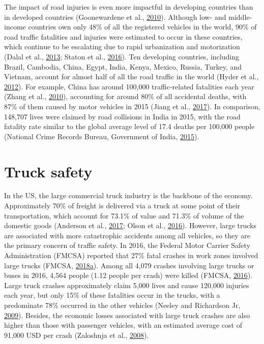 \documentclass[12pt]{book}
\numberwithin{equation}{chapter}
\begin{document}
The impact of road injuries is even more impactful in developing countries than in developed countries (Goonewardene et al., \protect\hyperlink{ref-goonewardene2010road}{2010}).
Although low- and middle-income countries own only 48\% of all the registered vehicles in the world, 90\% of road traffic fatalities and injuries were estimated to occur in these countries, which continue to be escalating due to rapid urbanization and motorization (Dalal et al., \protect\hyperlink{ref-dalal2013economics}{2013}; Staton et al., \protect\hyperlink{ref-staton2016road}{2016}).
Ten developing countries, including Brazil, Cambodia, China, Egypt, India, Kenya, Mexico, Russia, Turkey, and Vietnam, account for almost half of all the road traffic in the world (Hyder et al., \protect\hyperlink{ref-hyder2012addressing}{2012}).
For example, China has around 100,000 traffic-related fatalities each year (Zhang et al., \protect\hyperlink{ref-zhang2010road}{2010}), accounting for around 80\% of all accidental deaths, with 87\% of them caused by motor vehicles in 2015 (Jiang et al., \protect\hyperlink{ref-jiang2017transport}{2017}).
In comparison, 148,707 lives were claimed by road collisions in India in 2015, with the road fatality rate similar to the global average level of 17.4 deaths per 100,000 people (National Crime Records Bureau, Government of India, \protect\hyperlink{ref-india2015}{2015}).

\hypertarget{truck-safety}{%
\section{Truck safety}\label{truck-safety}}

In the US, the large commercial truck industry is the backbone of the economy. Approximately 70\% of freight is delivered via a truck at some point of their transportation, which account for 73.1\% of value and 71.3\% of volume of the domestic goods (Anderson et al., \protect\hyperlink{ref-anderson2017exploratory}{2017}; Olson et al., \protect\hyperlink{ref-olson2016weight}{2016}).
However, large trucks are associated with more catastrophic accidents among all vehicles, so they are the primary concern of traffic safety. In 2016, the Federal Motor Carrier Safety Administration (FMCSA) reported that 27\% fatal crashes in work zones involved large trucks (FMCSA, \protect\hyperlink{ref-fmcsareport2016}{2018}\protect\hyperlink{ref-fmcsareport2016}{a}). Among all 4,079 crashes involving large trucks or buses in 2016, 4,564 people (1.12 people per crash) were killed (FMCSA, \protect\hyperlink{ref-fmcsafacts2016}{2016}). Large truck crashes approximately claim 5,000 lives and cause 120,000 injuries each year, but only 15\% of these fatalities occur in the trucks, with a predominate 78\% occurred in the other vehicles (Neeley and Richardson Jr, \protect\hyperlink{ref-neeley2009effect}{2009}). Besides, the economic losses associated with large truck crashes are also higher than those with passenger vehicles, with an estimated average cost of 91,000 USD per crash (Zaloshnja et al., \protect\hyperlink{ref-zaloshnja2008unit}{2008}).
\end{document}
